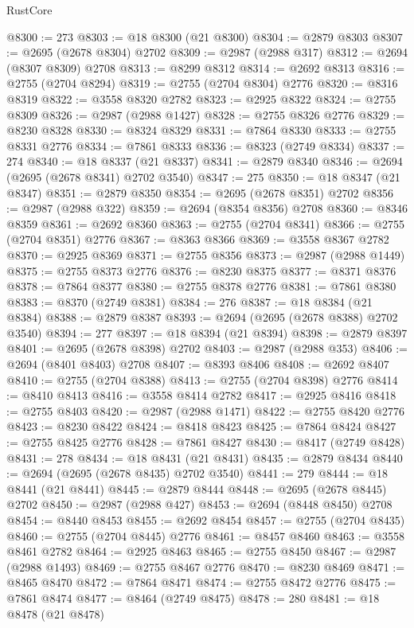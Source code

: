 \begin{lexlean}{RustCore}
\begin{coremodule}
@8300 := 273
@8303 := @18 @8300 (@21 @8300)
@8304 := @2879 @8303
@8307 := @2695 (@2678 @8304) @2702
@8309 := @2987 (@2988 @317)
@8312 := @2694 (@8307 @8309) @2708
@8313 := @8299 @8312
@8314 := @2692 @8313
@8316 := @2755 (@2704 @8294)
@8319 := @2755 (@2704 @8304) @2776
@8320 := @8316 @8319
@8322 := @3558 @8320 @2782
@8323 := @2925 @8322
@8324 := @2755 @8309
@8326 := @2987 (@2988 @1427)
@8328 := @2755 @8326 @2776
@8329 := @8230 @8328
@8330 := @8324 @8329
@8331 := @7864 @8330
@8333 := @2755 @8331 @2776
@8334 := @7861 @8333
@8336 := @8323 (@2749 @8334)
@8337 := 274
@8340 := @18 @8337 (@21 @8337)
@8341 := @2879 @8340
@8346 := @2694 (@2695 (@2678 @8341) @2702 @3540)
@8347 := 275
@8350 := @18 @8347 (@21 @8347)
@8351 := @2879 @8350
@8354 := @2695 (@2678 @8351) @2702
@8356 := @2987 (@2988 @322)
@8359 := @2694 (@8354 @8356) @2708
@8360 := @8346 @8359
@8361 := @2692 @8360
@8363 := @2755 (@2704 @8341)
@8366 := @2755 (@2704 @8351) @2776
@8367 := @8363 @8366
@8369 := @3558 @8367 @2782
@8370 := @2925 @8369
@8371 := @2755 @8356
@8373 := @2987 (@2988 @1449)
@8375 := @2755 @8373 @2776
@8376 := @8230 @8375
@8377 := @8371 @8376
@8378 := @7864 @8377
@8380 := @2755 @8378 @2776
@8381 := @7861 @8380
@8383 := @8370 (@2749 @8381)
@8384 := 276
@8387 := @18 @8384 (@21 @8384)
@8388 := @2879 @8387
@8393 := @2694 (@2695 (@2678 @8388) @2702 @3540)
@8394 := 277
@8397 := @18 @8394 (@21 @8394)
@8398 := @2879 @8397
@8401 := @2695 (@2678 @8398) @2702
@8403 := @2987 (@2988 @353)
@8406 := @2694 (@8401 @8403) @2708
@8407 := @8393 @8406
@8408 := @2692 @8407
@8410 := @2755 (@2704 @8388)
@8413 := @2755 (@2704 @8398) @2776
@8414 := @8410 @8413
@8416 := @3558 @8414 @2782
@8417 := @2925 @8416
@8418 := @2755 @8403
@8420 := @2987 (@2988 @1471)
@8422 := @2755 @8420 @2776
@8423 := @8230 @8422
@8424 := @8418 @8423
@8425 := @7864 @8424
@8427 := @2755 @8425 @2776
@8428 := @7861 @8427
@8430 := @8417 (@2749 @8428)
@8431 := 278
@8434 := @18 @8431 (@21 @8431)
@8435 := @2879 @8434
@8440 := @2694 (@2695 (@2678 @8435) @2702 @3540)
@8441 := 279
@8444 := @18 @8441 (@21 @8441)
@8445 := @2879 @8444
@8448 := @2695 (@2678 @8445) @2702
@8450 := @2987 (@2988 @427)
@8453 := @2694 (@8448 @8450) @2708
@8454 := @8440 @8453
@8455 := @2692 @8454
@8457 := @2755 (@2704 @8435)
@8460 := @2755 (@2704 @8445) @2776
@8461 := @8457 @8460
@8463 := @3558 @8461 @2782
@8464 := @2925 @8463
@8465 := @2755 @8450
@8467 := @2987 (@2988 @1493)
@8469 := @2755 @8467 @2776
@8470 := @8230 @8469
@8471 := @8465 @8470
@8472 := @7864 @8471
@8474 := @2755 @8472 @2776
@8475 := @7861 @8474
@8477 := @8464 (@2749 @8475)
@8478 := 280
@8481 := @18 @8478 (@21 @8478)

\end{coremodule}
\end{lexlean}
